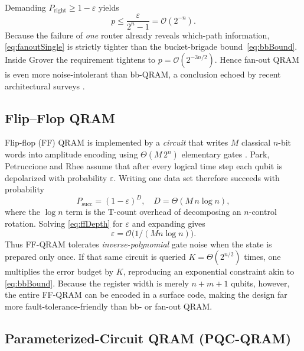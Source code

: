\documentclass[11pt]{article}
\begin{document}
Demanding \(P_{\mathrm{right}}\ge 1-\varepsilon\) yields
\begin{equation}
   p \le \frac{\varepsilon}{2^{n}-1}
       = \mathcal{O}(2^{-n}).
   \label{eq:fanoutSingle}
\end{equation}
Because the failure of \emph{one} router already reveals which-path
information, \eqref{eq:fanoutSingle} is strictly tighter than the
bucket-brigade bound~\eqref{eq:bbBound}.
Inside Grover the requirement tightens to
\(p=\mathcal{O}(2^{-3n/2})\).
Hence fan-out QRAM is even more noise-intolerant than bb-QRAM, a
conclusion echoed by recent architectural surveys
\cite{Phalak2023,Morales2023}.



\subsection{Flip--Flop QRAM}
\label{ssec:ff}

Flip-flop (FF) QRAM is implemented by a \emph{circuit} that writes
\(M\) classical \(n\)-bit words into amplitude encoding using
\(\Theta(M\,2^{n})\) elementary gates
\cite{Park2019}.
Park, Petruccione and Rhee assume that after every logical time step
each qubit is depolarized with probability \(\varepsilon\).  
Writing one data set therefore succeeds with probability
\begin{equation}
   P_{\mathrm{succ}}
      =(1-\varepsilon)^{D},
      \quad
      D=\Theta(M\,n\log n),
   \label{eq:ffDepth}
\end{equation}
where the \(\log n\) term is the T-count overhead of decomposing an
\(n\)-control rotation.  
Solving \eqref{eq:ffDepth} for \(\varepsilon\) and expanding gives
\[
   \varepsilon
      = \mathcal{O}\!\bigl(1/(M n\log n)\bigr).
\]
Thus FF-QRAM tolerates \emph{inverse-polynomial} gate noise when the
state is prepared only once.  
If that same circuit is queried \(K=\Theta(2^{n/2})\) times,
one multiplies the error budget by \(K\), reproducing an exponential
constraint akin to \eqref{eq:bbBound}.  
Because the register width is merely \(n+m+1\) qubits, however, the
entire FF-QRAM can be encoded in a surface code, making the design far
more fault-tolerance-friendly than bb- or fan-out QRAM.



\subsection{Parameterized-Circuit QRAM (PQC-QRAM)}
\label{ssec:pqc}
\end{document}
